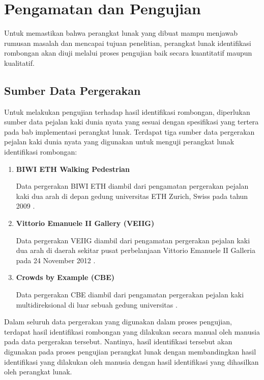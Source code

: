 \chapter{Pengamatan dan Pengujian}
\label{chap:pengujian}

Untuk memastikan bahwa perangkat lunak yang dibuat mampu menjawab rumusan masalah dan mencapai tujuan penelitian, perangkat lunak identifikasi rombongan akan diuji melalui proses pengujian baik secara kuantitatif maupun kualitatif.

\section{Sumber Data Pergerakan}
\label{bab6:data-pergerakan}

Untuk melakukan pengujian terhadap hasil identifikasi rombongan, diperlukan sumber data pejalan kaki dunia nyata yang sesuai dengan spesifikasi yang tertera pada bab implementasi perangkat lunak. Terdapat tiga sumber data pergerakan pejalan kaki dunia nyata yang digunakan untuk menguji perangkat lunak identifikasi rombongan:

\begin{enumerate}
    \item \textbf{BIWI ETH Walking Pedestrian}
    
    Data pergerakan BIWI ETH diambil dari pengamatan pergerakan pejalan kaki dua arah di depan gedung universitas ETH Zurich, Swiss pada tahun 2009 \cite{pellegrini:eth}. 
    
    \item \textbf{Vittorio Emanuele II Gallery (VEIIG)}
    
    Data pergerakan VEIIG diambil dari pengamatan pergerakan pejalan kaki dua arah di daerah sekitar pusat perbelanjaan Vittorio Emanuele II Galleria pada 24 November 2012 \cite{bandini:gveii}.
    
    \item \textbf{Crowds by Example (CBE)}
    
    Data pergerakan CBE diambil dari pengamatan pergerakan pejalan kaki multidireksional di luar sebuah gedung universitas \cite{solera:06:range-reference}.
\end{enumerate}

Dalam seluruh data pergerakan yang digunakan dalam proses pengujian, terdapat hasil identifikasi rombongan yang dilakukan secara manual oleh manusia pada data pergerakan tersebut. Nantinya, hasil identifikasi tersebut akan digunakan pada proses pengujian perangkat lunak dengan membandingkan hasil identifikasi yang dilakukan oleh manusia dengan hasil identifikasi yang dihasilkan oleh perangkat lunak.

